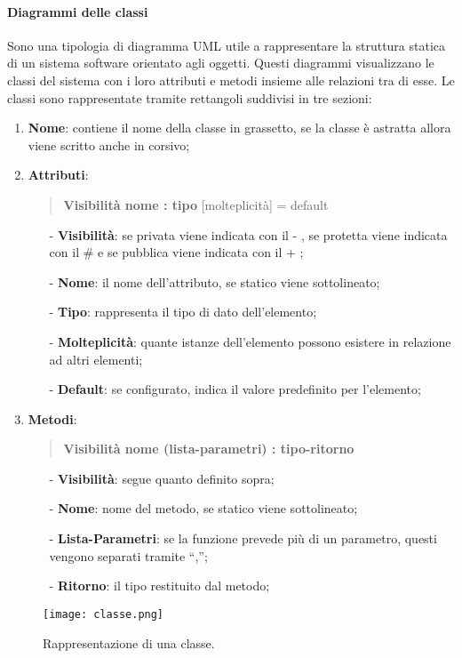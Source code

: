     \paragraph{Diagrammi delle classi}
    Sono una tipologia di diagramma UML utile a rappresentare la struttura statica di un sistema software orientato agli oggetti. Questi diagrammi visualizzano le classi del sistema con i loro attributi e metodi insieme alle relazioni tra di esse.\newline
    Le classi sono rappresentate tramite rettangoli suddivisi in tre sezioni: 
    \begin{enumerate}
        \item \textbf{Nome}: contiene il nome della classe in grassetto, se la classe è astratta allora viene scritto anche in corsivo;
        \item \textbf{Attributi}:
        \begin{quote}
            \textbf{Visibilità nome : tipo} [molteplicità] = default
        \end{quote}
        \begin{itemize}
            \item [-] \textbf{Visibilità}: se privata viene indicata con il - , se protetta viene indicata con il \# e se pubblica viene indicata con il + ;
            \item [-] \textbf{Nome}: il nome dell’attributo, se statico viene sottolineato;
            \item [-] \textbf{Tipo}: rappresenta il tipo di dato dell’elemento;
            \item [-] \textbf{Molteplicità}: quante istanze dell’elemento possono esistere in relazione ad altri elementi;
            \item [-] \textbf{Default}: se configurato, indica il valore predefinito per l’elemento;
        \end{itemize}
        
        \item \textbf{Metodi}:
        \begin{quote}
            \textbf{Visibilità nome (lista-parametri) : tipo-ritorno}
        \end{quote}
        \begin{itemize}
            \item [-] \textbf{Visibilità}: segue quanto definito sopra;
            \item [-] \textbf{Nome}: nome del metodo, se statico viene sottolineato;
            \item [-] \textbf{Lista-Parametri}: se la funzione prevede più di un parametro, questi vengono separati tramite “,”;
            \item [-] \textbf{Ritorno}: il tipo restituito dal metodo;
        \end{itemize}
    \end{enumerate}
    \begin{figure}[H]
        \centering
        \texttt{[image: classe.png]}
        \caption{Rappresentazione di una classe.}
    \end{figure}
    
